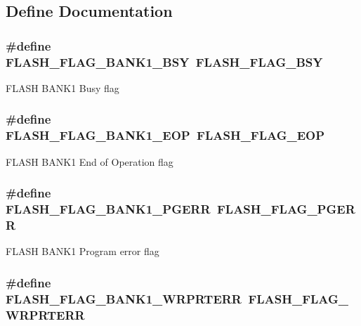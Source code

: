 \subsection{Define Documentation}
\hypertarget{group__FLASH__Flags_ga1f85e6d511503886e9fbe7d0228c97a4}{
\subsubsection[{FLASH\_\-FLAG\_\-BANK1\_\-BSY}]{\setlength{\rightskip}{0pt plus 5cm}\#define FLASH\_\-FLAG\_\-BANK1\_\-BSY~FLASH\_\-FLAG\_\-BSY}}
\label{group__FLASH__Flags_ga1f85e6d511503886e9fbe7d0228c97a4}
FLASH BANK1 Busy flag \hypertarget{group__FLASH__Flags_gafa7670ee5ce8a2eb1f64c458a9f08e5b}{
\subsubsection[{FLASH\_\-FLAG\_\-BANK1\_\-EOP}]{\setlength{\rightskip}{0pt plus 5cm}\#define FLASH\_\-FLAG\_\-BANK1\_\-EOP~FLASH\_\-FLAG\_\-EOP}}
\label{group__FLASH__Flags_gafa7670ee5ce8a2eb1f64c458a9f08e5b}
FLASH BANK1 End of Operation flag \hypertarget{group__FLASH__Flags_gaa1056ffdd1c434a2967d5ed7c0d263be}{
\subsubsection[{FLASH\_\-FLAG\_\-BANK1\_\-PGERR}]{\setlength{\rightskip}{0pt plus 5cm}\#define FLASH\_\-FLAG\_\-BANK1\_\-PGERR~FLASH\_\-FLAG\_\-PGERR}}
\label{group__FLASH__Flags_gaa1056ffdd1c434a2967d5ed7c0d263be}
FLASH BANK1 Program error flag \hypertarget{group__FLASH__Flags_ga1646345adbcda773ef25785b1bdc4c43}{
\subsubsection[{FLASH\_\-FLAG\_\-BANK1\_\-WRPRTERR}]{\setlength{\rightskip}{0pt plus 5cm}\#define FLASH\_\-FLAG\_\-BANK1\_\-WRPRTERR~FLASH\_\-FLAG\_\-WRPRTERR}}
